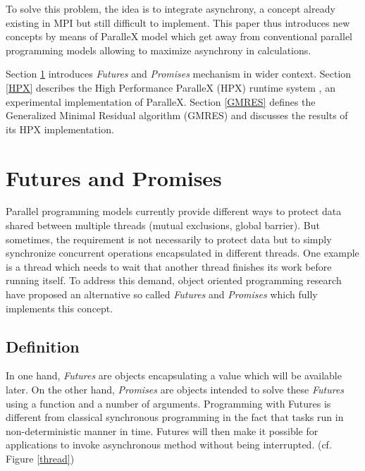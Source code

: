 \documentclass{llncs}
\begin{document}
To solve this problem, the idea is to integrate asynchrony, a concept already
existing in MPI but still difficult to implement. This paper thus introduces
new concepts by means of ParalleX model which get away from conventional
parallel programming models allowing to maximize asynchrony in
calculations.\smallskip

Section \ref{Futures} introduces \emph{Futures} and \emph{Promises} mechanism
in wider context. Section \ref{HPX} describes the High Performance ParalleX
(HPX) runtime system \cite{ParalleX}, an experimental implementation of
ParalleX. Section \ref{GMRES} defines the Generalized Minimal Residual
algorithm (GMRES) \cite{GMRES} and discusses the results of its HPX
implementation.

\section{Futures and Promises}\label{Futures}
Parallel programming models currently provide different ways to protect data
shared between multiple threads (mutual exclusions, global barrier). But
sometimes, the requirement is not necessarily to protect data but to simply
synchronize concurrent operations encapsulated in different threads. One
example is a thread which needs to wait that another thread finishes its work
before running itself. To address this demand, object oriented programming
research have proposed an alternative so called \emph{Futures} and
\emph{Promises} \cite{Futures1} \cite{Futures2} which fully implements this
concept.

\subsection{Definition}
In one hand, \emph{Futures} are objects encapsulating a value which will be
available later. On the other hand, \emph{Promises} are objects intended to
solve these \emph{Futures} using a function and a number of arguments.
Programming with Futures is different from classical synchronous programming in
the fact that tasks run in non-deterministic manner in time. Futures will then
make it possible for applications to invoke asynchronous method without being
interrupted. (cf. Figure \ref{thread})
\end{document}
